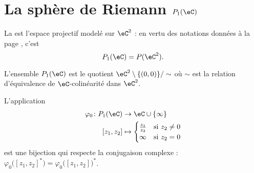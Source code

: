 
\section{La sphère de Riemann \( P_1(\eC)\)}

\begin{definition}      \label{DEFooSZGNooTzFYbh}
	La  est l'espace projectif modelé sur \( \eC^2\) : en vertu des notations données à la page \pageref{PgNotimesjNtMoW}, c'est
	\begin{equation}
		P_1(\eC)=P(\eC^2).
	\end{equation}
\end{definition}

L'ensemble \( P_1(\eC)\) est le quotient \( \eC^2\setminus\{ (0,0) \}/\sim\) où \( \sim\) est la relation d'équivalence de \( \eC\)-colinéarité dans \( \eC^2\).

\begin{lemma}       \label{LEMooKWZDooEIraSJ}
	L'application
	\begin{equation}        \label{EQooKJIZooZjhzuU}
		\begin{aligned}
			\varphi_0\colon P_1(\eC) & \to \eC\cup\{ \infty \}                            \\
			[z_1,z_2]                & \mapsto \begin{cases}
				                                   \frac{ z_1 }{ z_2 } & \text{si } z_2\neq 0 \\
				                                   \infty              & \text{si } z_2=0
			                                   \end{cases}
		\end{aligned}
	\end{equation}
	est une bijection qui respecte la conjugaison complexe : \( \varphi_0\big( [z_1,z_2]^* \big)=\varphi_0\big( [z_1,z_2] \big)^*\).
\end{lemma}

